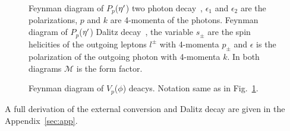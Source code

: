  \begin{figure}[h!]\begin{center}
 		\quad
 		\caption[Feynman diagram of $P_p$($\etaP$) two photon decay and Dalitz decay]{\label{fig:piz.alldecay}Feynman diagram of $P_p$($\etaP$) two photon decay~, $\epsilon_1$ and $\epsilon_2$ are the polarizations, $p$ and $k$ are 4-momenta of the photons.  Feynman diagram of $P_p$($\etaP$) Dalitz decay~, the variable $s_\pm$ are the spin helicities of the outgoing leptons $l^\pm$ with 4-momenta $p_{\pm}$ and $\epsilon$ is the polarization of the outgoing photon with 4-momenta $k$. In both diagrams $\mathcal{M}$ is the form factor.}
 	\end{center}\end{figure}
\begin{figure}[h!]\begin{center}
 	 		\quad
 	 		\caption[Feynman diagram of $V_p$($\phi$) decays]{\label{fig:phi.alldecay}Feynman diagram of $V_p$($\phi$) deacys. Notation same as in Fig.~\ref{fig:piz.alldecay}.}
\end{center}\end{figure}
 A full derivation of the external conversion and Dalitz decay are given in the Appendix~\ref{sec:app}.
